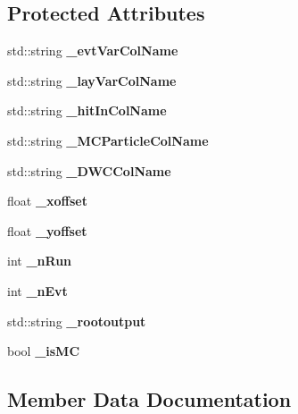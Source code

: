 \subsection*{Protected Attributes}
\begin{DoxyCompactItemize}
\item 
std\-::string {\bfseries \-\_\-evt\-Var\-Col\-Name}\label{classCALICE_1_1TrackValidationProcessor_a76ddd6b305410b6413f073d741743ee0}

\item 
std\-::string {\bfseries \-\_\-lay\-Var\-Col\-Name}\label{classCALICE_1_1TrackValidationProcessor_a7161ade55449fddbff031a7f6f205c5b}

\item 
std\-::string {\bfseries \-\_\-hit\-In\-Col\-Name}\label{classCALICE_1_1TrackValidationProcessor_aa37bb1a3f8daad8869a739424424b1a4}

\item 
std\-::string {\bfseries \-\_\-\-M\-C\-Particle\-Col\-Name}\label{classCALICE_1_1TrackValidationProcessor_a7cb2eb63f3742d45bcb200ab856ee369}

\item 
std\-::string {\bfseries \-\_\-\-D\-W\-C\-Col\-Name}\label{classCALICE_1_1TrackValidationProcessor_aa7967db3adedfaf442fbd0c305327fcb}

\item 
float {\bfseries \-\_\-xoffset}\label{classCALICE_1_1TrackValidationProcessor_a0e591b95122cdc9574bc4920b3e0284c}

\item 
float {\bfseries \-\_\-yoffset}\label{classCALICE_1_1TrackValidationProcessor_a4939b52b2b0f0ffafe839d1d3a370cdf}

\item 
int {\bf \-\_\-n\-Run}
\item 
int {\bf \-\_\-n\-Evt}
\item 
std\-::string {\bfseries \-\_\-rootoutput}\label{classCALICE_1_1TrackValidationProcessor_a91381cdf201234a7adc8f0169ab2c97b}

\item 
bool {\bfseries \-\_\-is\-M\-C}\label{classCALICE_1_1TrackValidationProcessor_a42090c30cc0793268a7346b01b7216a2}

\end{DoxyCompactItemize}


\subsection{Member Data Documentation}
